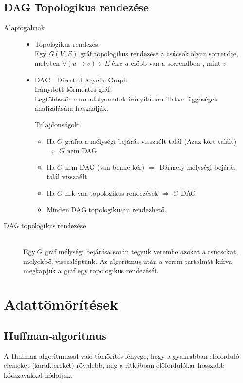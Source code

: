 \documentclass[margin=0px]{article}
\begin{document}
		\subsection{DAG Topologikus rendezése}
			\begin{description}
				\item[Alapfogalmak] \hfill
					\begin{itemize}
						\item Topologikus rendezés: \\
							Egy $G(V,E)$ gráf topologikus rendezése a csúcsok olyan sorrendje, melyben $\forall (u\rightarrow v) \in E$ élre $u$ előbb van a sorrendben , mint $v$
						\item DAG - Directed Acyclic Graph: \\
							Irányított körmentes gráf. \\
							Legtöbbször munkafolyamatok irányítására illetve függőségek analizálására használják.
							
							Tulajdonságok:
							\begin{itemize}
								\item Ha $G$ gráfra a mélységi bejárás visszaélt talál (Azaz kört talált) $\Longrightarrow$ $G$ nem DAG
								\item Ha $G$ nem DAG (van benne kör) $\Longrightarrow$ Bármely mélységi bejárás talál visszaélt
								\item Ha $G$-nek van topologikus rendezések $\Longrightarrow$ $G$ DAG
								\item Minden DAG topologikusan rendezhető.
							\end{itemize}
					\end{itemize} 
				\item[DAG topologikus rendezése] \hfill \\
					Egy $G$ gráf mélységi bejárása során tegyük verembe azokat a csúcsokat, melyekből visszaléptünk. Az algoritmus után a verem tartalmát kiírva megkapjuk a gráf egy topologikus rendezését.
			\end{description}
	\section{Adattömörítések}
		\subsection{Huffman-algoritmus}
			A Huffman-algoritmussal való tömörítés lényege, hogy a gyakrabban előforduló elemeket (karaktereket) rövidebb, míg a ritkábban előfordulókar hosszabb kódszavakkal kódoljuk.
			
\end{document}

